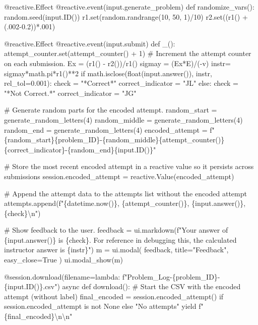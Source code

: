 \documentclass[
  letterpaper,
  DIV=11,
  numbers=noendperiod]{scrreprt}
\newenvironment{Shaded}{\begin{snugshade}}{\end{snugshade}}
\newcommand{\NormalTok}[1]{\textcolor[rgb]{0.00,0.23,0.31}{#1}}
\begin{document}
\begin{Shaded}
\begin{Highlighting}[]
\NormalTok{    @reactive.Effect}
\NormalTok{    @reactive.event(input.generate\_problem)}
\NormalTok{    def randomize\_vars():}
\NormalTok{        random.seed(input.ID())}
\NormalTok{        r1.set(random.randrange(10, 50, 1)/10)}
\NormalTok{        r2.set((r1() + (.002{-}0.2))*.001)}
        
\NormalTok{    @reactive.Effect}
\NormalTok{    @reactive.event(input.submit)}
\NormalTok{    def \_():}
\NormalTok{        attempt\_counter.set(attempt\_counter() + 1)  \# Increment the attempt counter on each submission.}
\NormalTok{        Ex = (r1() {-} r2())/r1()}
\NormalTok{        sigmay = (Ex*E)/({-}v)}
\NormalTok{        instr= sigmay*math.pi*r1()**2}
\NormalTok{        if math.isclose(float(input.answer()), instr, rel\_tol=0.001):}
\NormalTok{            check = "*Correct*"}
\NormalTok{            correct\_indicator = "JL"}
\NormalTok{        else:}
\NormalTok{            check = "*Not Correct.*"}
\NormalTok{            correct\_indicator = "JG"}

\NormalTok{        \# Generate random parts for the encoded attempt.}
\NormalTok{        random\_start = generate\_random\_letters(4)}
\NormalTok{        random\_middle = generate\_random\_letters(4)}
\NormalTok{        random\_end = generate\_random\_letters(4)}
\NormalTok{        encoded\_attempt = f"\{random\_start\}\{problem\_ID\}{-}\{random\_middle\}\{attempt\_counter()\}\{correct\_indicator\}{-}\{random\_end\}\{input.ID()\}"}

\NormalTok{        \# Store the most recent encoded attempt in a reactive value so it persists across submissions}
\NormalTok{        session.encoded\_attempt = reactive.Value(encoded\_attempt)}

\NormalTok{        \# Append the attempt data to the attempts list without the encoded attempt}
\NormalTok{        attempts.append(f"\{datetime.now()\}, \{attempt\_counter()\}, \{input.answer()\}, \{check\}\textbackslash{}n")}

\NormalTok{        \# Show feedback to the user.}
\NormalTok{        feedback = ui.markdown(f"Your answer of \{input.answer()\} is \{check\}. For reference in debugging this, the calculated instructor answer is \{instr\}")}
\NormalTok{        m = ui.modal(}
\NormalTok{            feedback,}
\NormalTok{            title="Feedback",}
\NormalTok{            easy\_close=True}
\NormalTok{        )}
\NormalTok{        ui.modal\_show(m)}

\NormalTok{    @session.download(filename=lambda: f"Problem\_Log{-}\{problem\_ID\}{-}\{input.ID()\}.csv")}
\NormalTok{    async def download():}
\NormalTok{        \# Start the CSV with the encoded attempt (without label)}
\NormalTok{        final\_encoded = session.encoded\_attempt() if session.encoded\_attempt is not None else "No attempts"}
\NormalTok{        yield f"\{final\_encoded\}\textbackslash{}n\textbackslash{}n"}
        

\end{Highlighting}
\end{Shaded}
\end{document}
